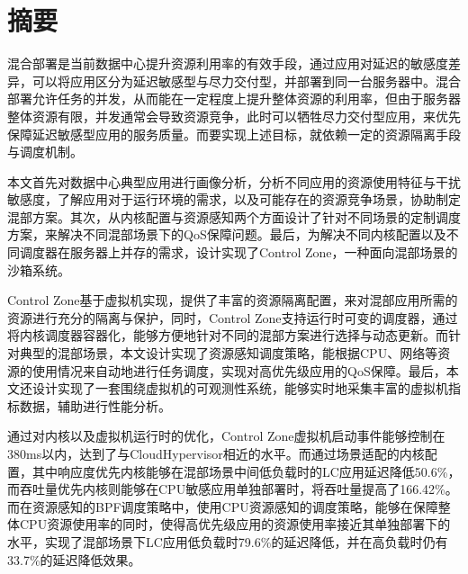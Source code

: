 
\maketitle%
\MAKETITLE%
\makedeclaration%
\intobmk\chapter*{摘\quad 要}%
\setcounter{page}{1}%


混合部署是当前数据中心提升资源利用率的有效手段，通过应用对延迟的敏感度差异，可以将应用区分为延迟敏感型与尽力交付型，并部署到同一台服务器中。混合部署允许任务的并发，从而能在一定程度上提升整体资源的利用率，但由于服务器整体资源有限，并发通常会导致资源竞争，此时可以牺牲尽力交付型应用，来优先保障延迟敏感型应用的服务质量。而要实现上述目标，就依赖一定的资源隔离手段与调度机制。

本文首先对数据中心典型应用进行画像分析，分析不同应用的资源使用特征与干扰敏感度，了解应用对于运行环境的需求，以及可能存在的资源竞争场景，协助制定混部方案。其次，从内核配置与资源感知两个方面设计了针对不同场景的定制调度方案，来解决不同混部场景下的QoS保障问题。最后，为解决不同内核配置以及不同调度器在服务器上并存的需求，设计实现了Control Zone，一种面向混部场景的沙箱系统。

Control Zone基于虚拟机实现，提供了丰富的资源隔离配置，来对混部应用所需的资源进行充分的隔离与保护，同时，Control Zone支持运行时可变的调度器，通过将内核调度器容器化，能够方便地针对不同的混部方案进行选择与动态更新。而针对典型的混部场景，本文设计实现了资源感知调度策略，能根据CPU、网络等资源的使用情况来自动地进行任务调度，实现对高优先级应用的QoS保障。最后，本文还设计实现了一套围绕虚拟机的可观测性系统，能够实时地采集丰富的虚拟机指标数据，辅助进行性能分析。


通过对内核以及虚拟机运行时的优化，Control Zone虚拟机启动事件能够控制在380ms以内，达到了与CloudHypervisor相近的水平。而通过场景适配的内核配置，其中响应度优先内核能够在混部场景中间低负载时的LC应用延迟降低50.6\%，而吞吐量优先内核则能够在CPU敏感应用单独部署时，将吞吐量提高了166.42\%。而在资源感知的BPF调度策略中，使用CPU资源感知的调度策略，能够在保障整体CPU资源使用率的同时，使得高优先级应用的资源使用率接近其单独部署下的水平，实现了混部场景下LC应用低负载时79.6\%的延迟降低，并在高负载时仍有33.7\%的延迟降低效果。

